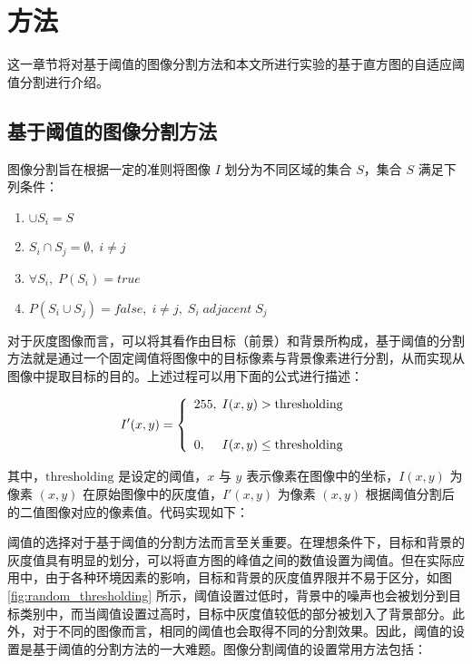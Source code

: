 \section{方法} 
\label{sec:proposed}

这一章节将对基于阈值的图像分割方法和本文所进行实验的基于直方图的自适应阈值分割进行介绍。

\subsection{基于阈值的图像分割方法}

图像分割旨在根据一定的准则将图像 $I$ 划分为不同区域的集合 $S$，集合 $S$ 满足下列条件：

\begin{enumerate}
	\item $\cup S_i = S$  
	\item $S_i \cap S_j=\emptyset,\;i \neq j$
	\item $\forall S_i,\; P(S_i)=true$
	\item $P(S_i\cup S_j)=false,\; i\neq j,\; S_i \; adjacent \; S_j$
\end{enumerate}
 
对于灰度图像而言，可以将其看作由目标（前景）和背景所构成，基于阈值的分割方法就是通过一个固定阈值将图像中的目标像素与背景像素进行分割，从而实现从图像中提取目标的目的。上述过程可以用下面的公式进行描述：

\begin{equation}
I'(x, y)=\left\{\begin{array}{l}
255, \;I(x, y)>\text{thresholding} \\[2em]
0, \;\quad I(x, y) \leq \text{thresholding}
\end{array}\right.
\vspace{0.5cm}
\end{equation}

其中，$\text{thresholding}$ 是设定的阈值，$x$ 与 $y$ 表示像素在图像中的坐标，$I(x, y)$ 为像素 $(x,y)$ 在原始图像中的灰度值，$I'(x, y)$ 为像素 $(x,y)$ 根据阈值分割后的二值图像对应的像素值。代码实现如下：
\vspace{0.3cm}


阈值的选择对于基于阈值的分割方法而言至关重要。在理想条件下，目标和背景的灰度值具有明显的划分，可以将直方图的峰值之间的数值设置为阈值。但在实际应用中，由于各种环境因素的影响，目标和背景的灰度值界限并不易于区分，如图 \ref{fig:random_thresholding} 所示，阈值设置过低时，背景中的噪声也会被划分到目标类别中，而当阈值设置过高时，目标中灰度值较低的部分被划入了背景部分。此外，对于不同的图像而言，相同的阈值也会取得不同的分割效果。因此，阈值的设置是基于阈值的分割方法的一大难题。图像分割阈值的设置常用方法包括：

